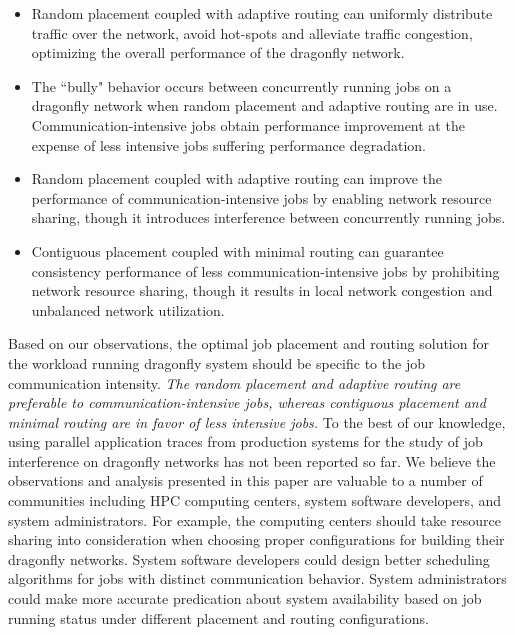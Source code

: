 \begin{itemize}
   
    \item Random placement coupled with adaptive routing can uniformly distribute traffic over the network, avoid hot-spots and alleviate traffic congestion, optimizing the overall performance of the dragonfly network. 
    
    \item The ``bully" behavior occurs between concurrently running jobs on a dragonfly network when random placement and adaptive routing are in use. Communication-intensive jobs obtain performance improvement at the expense of less intensive jobs suffering performance degradation. 
    
    \item Random placement coupled with adaptive routing can improve the performance of communication-intensive jobs by enabling network resource sharing, though it introduces interference between concurrently running jobs.
    
    \item Contiguous placement coupled with minimal routing can guarantee consistency performance of less communication-intensive jobs by prohibiting network resource sharing, though it results in local network congestion and unbalanced network utilization.
    
\end{itemize}

Based on our observations, the optimal job placement and routing solution for the workload running dragonfly system should be specific to the job communication intensity. \emph{The random placement and adaptive routing are preferable to communication-intensive jobs, whereas contiguous placement and minimal routing are in favor of less intensive jobs.} To the best of our knowledge, using parallel application traces from production systems for the study of job interference on dragonfly networks has not been reported so far. We believe the observations and analysis presented in this paper are valuable to a number of communities including HPC computing centers, system software developers, and system administrators. For example, the computing centers should take resource sharing into consideration when choosing proper configurations for building their dragonfly networks. System software developers could design better scheduling algorithms for jobs with distinct communication behavior. System administrators could make more accurate predication about system availability based on job running status under different placement and routing configurations.

